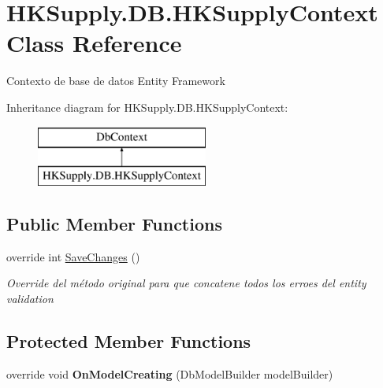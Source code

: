 \hypertarget{class_h_k_supply_1_1_d_b_1_1_h_k_supply_context}{}\section{H\+K\+Supply.\+D\+B.\+H\+K\+Supply\+Context Class Reference}
\label{class_h_k_supply_1_1_d_b_1_1_h_k_supply_context}


Contexto de base de datos Entity Framework  


Inheritance diagram for H\+K\+Supply.\+D\+B.\+H\+K\+Supply\+Context\+:\begin{figure}[H]
\begin{center}
\leavevmode
\includegraphics[height=2.000000cm]{class_h_k_supply_1_1_d_b_1_1_h_k_supply_context}
\end{center}
\end{figure}
\subsection*{Public Member Functions}
\begin{DoxyCompactItemize}
\item 
override int \mbox{\hyperlink{class_h_k_supply_1_1_d_b_1_1_h_k_supply_context_a2a1188ce8fd98551e036cb87ae342132}{Save\+Changes}} ()
\begin{DoxyCompactList}\small\item\em Override del método original para que concatene todos los erroes del entity validation \end{DoxyCompactList}\end{DoxyCompactItemize}
\subsection*{Protected Member Functions}
\begin{DoxyCompactItemize}
\item 
\mbox{\label{class_h_k_supply_1_1_d_b_1_1_h_k_supply_context_aeb9cce28b5eefa769efd1803771a6c4a}} 
override void {\bfseries On\+Model\+Creating} (Db\+Model\+Builder model\+Builder)
\end{DoxyCompactItemize}
